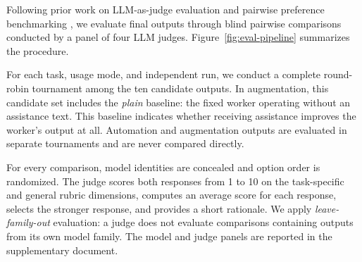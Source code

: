 Following prior work on LLM-as-judge evaluation and pairwise preference benchmarking \citep{zheng2023,chiang2024}, we evaluate final outputs through blind pairwise comparisons conducted by a panel of four LLM judges. Figure~\ref{fig:eval-pipeline} summarizes the procedure.


For each task, usage mode, and independent run, we conduct a complete round-robin tournament among the ten candidate outputs. In augmentation, this candidate set includes the \emph{plain} baseline: the fixed worker operating without an assistance text. This baseline indicates whether receiving assistance improves the worker's output at all. Automation and augmentation
outputs are evaluated in separate tournaments and are never compared directly. 

For every comparison, model identities are concealed and option order is randomized. The judge scores both responses from 1 to 10 on the task-specific and general rubric dimensions, computes an average score for each response, selects the stronger response, and provides a short rationale. We apply \emph{leave-family-out} evaluation: a judge does not evaluate comparisons containing outputs from its own model family. The model and judge panels are reported in the supplementary document.

